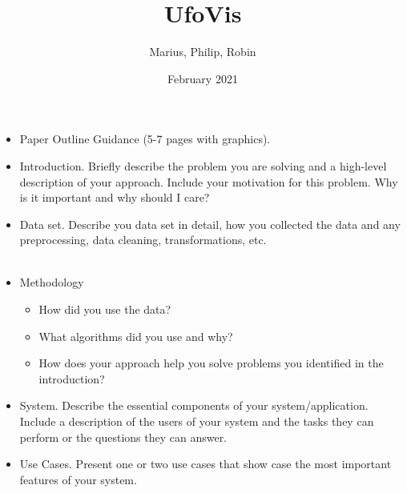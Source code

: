 \documentclass{article}
\title{UfoVis}
\author{Marius, Philip, Robin}
\date{February 2021}
\begin{document}
\maketitle

\begin{itemize}
    \item Paper Outline Guidance (5-7 pages with graphics).
    \item Introduction.  Briefly describe the problem you are solving and a high-level description of your approach.  Include your motivation for this problem.  Why is it important and why should I care? 
    \item Data set.  Describe you data set in detail, how you collected the data and any preprocessing, data cleaning, transformations, etc.\\\\
    \item Methodology
    \begin{itemize}
        \item How did you use the data?
        \item What algorithms did you use and why?
        \item How does your approach help you solve problems you identified in the introduction?
    \end{itemize}
    \item System.  Describe the essential components of your system/application.  Include a description of the users of your system and the tasks they can perform or the questions they can answer.
    \item Use Cases.  Present one or two use cases that show case the most important features of your system.
\end{itemize}
\end{document}
